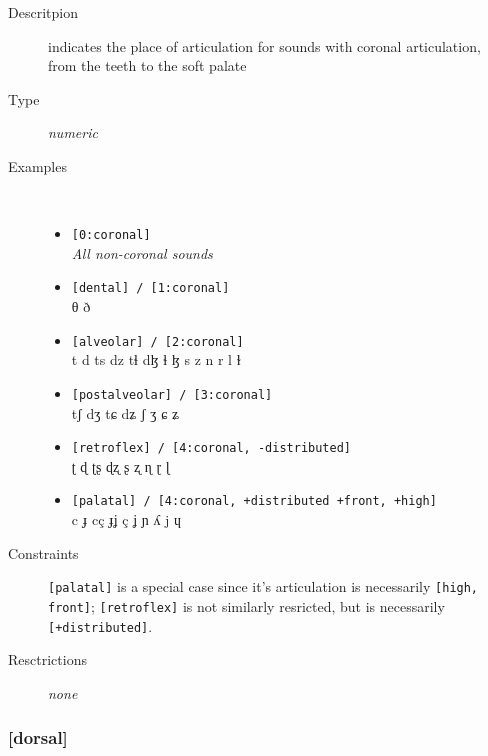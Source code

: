 \documentclass[10pt,letterpaper]{article}
\begin{document}
\begin{description}
\item[Descritpion] indicates the place of articulation for sounds with coronal articulation, from the teeth to the soft palate
\item[Type] \emph{numeric}
\item[Examples]\
  \begin{itemize}
    \item \texttt{[0:coronal]}\\
      \emph{All non-coronal sounds}
    \item \texttt{[dental] / [1:coronal]}\\
      θ ð 
    \item \texttt{[alveolar] / [2:coronal]}\\
      t d ts dz tɬ dɮ ɬ ɮ s z n r l ɫ 
    \item \texttt{[postalveolar] / [3:coronal]}\\
      tʃ dʒ tɕ dʑ ʃ ʒ ɕ ʑ 
    \item \texttt{[retroflex] / [4:coronal, -distributed]}\\
      ʈ ɖ ʈʂ ɖʐ ʂ ʐ ɳ ɽ ɭ 
    \item \texttt{[palatal] / [4:coronal, +distributed +front, +high]}\\
      c ɟ cç ɟʝ ç ʝ ɲ ʎ j ɥ
  \end{itemize}
\item[Constraints] \texttt{[palatal]} is a special case since it's articulation is necessarily \texttt{[high, front]}; \texttt{[retroflex]} is not similarly resricted, but is necessarily \texttt{[+distributed]}.
\item[Resctrictions] \emph{none}
\end{description}

\subsubsection{[dorsal]}
\label{ssub:feature_dorsal}

\end{document}
